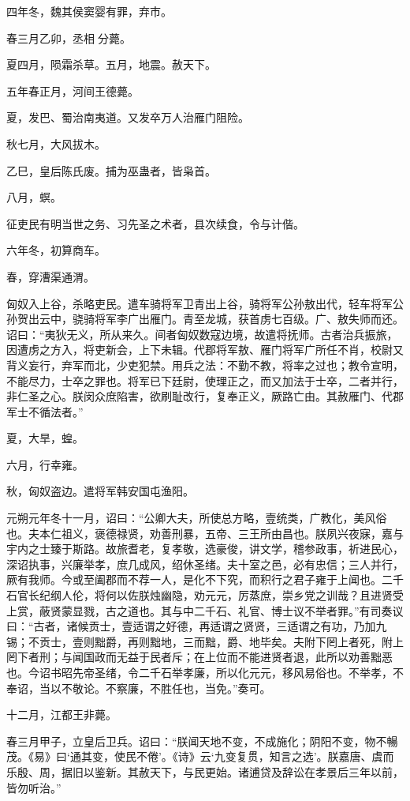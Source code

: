 \documentclass[]{article}
\begin{document}
四年冬，魏其侯窦婴有罪，弃市。

春三月乙卯，丞相分薨。

夏四月，陨霜杀草。五月，地震。赦天下。

五年春正月，河间王德薨。

夏，发巴、蜀治南夷道。又发卒万人治雁门阻险。

秋七月，大风拔木。

乙巳，皇后陈氏废。捕为巫蛊者，皆枭首。

八月，螟。

征吏民有明当世之务、习先圣之术者，县次续食，令与计偕。

六年冬，初算商车。

春，穿漕渠通渭。

匈奴入上谷，杀略吏民。遣车骑将军卫青出上谷，骑将军公孙敖出代，轻车将军公孙贺出云中，骁骑将军李广出雁门。青至龙城，获首虏七百级。广、敖失师而还。诏曰：``夷狄无义，所从来久。间者匈奴数寇边境，故遣将抚师。古者治兵振旅，因遭虏之方入，将吏新会，上下未辑。代郡将军敖、雁门将军广所任不肖，校尉又背义妄行，弃军而北，少吏犯禁。用兵之法：不勤不教，将率之过也；教令宣明，不能尽力，士卒之罪也。将军已下廷尉，使理正之，而又加法于士卒，二者并行，非仁圣之心。朕闵众庶陷害，欲刷耻改行，复奉正义，厥路亡由。其赦雁门、代郡军士不循法者。''

夏，大旱，蝗。

六月，行幸雍。

秋，匈奴盗边。遣将军韩安国屯渔阳。

元朔元年冬十一月，诏曰：``公卿大夫，所使总方略，壹统类，广教化，美风俗也。夫本仁祖义，褒德禄贤，劝善刑暴，五帝、三王所由昌也。朕夙兴夜寐，嘉与宇内之士臻于斯路。故旅耆老，复孝敬，选豪俊，讲文学，稽参政事，祈进民心，深诏执事，兴廉举孝，庶几成风，绍休圣绪。夫十室之邑，必有忠信；三人并行，厥有我师。今或至阖郡而不荐一人，是化不下究，而积行之君子雍于上闻也。二千石官长纪纲人伦，将何以佐朕烛幽隐，劝元元，厉蒸庶，崇乡党之训哉？且进贤受上赏，蔽贤蒙显戮，古之道也。其与中二千石、礼官、博士议不举者罪。''有司奏议曰：``古者，诸候贡士，壹适谓之好德，再适谓之贤贤，三适谓之有功，乃加九锡；不贡士，壹则黜爵，再则黜地，三而黜，爵、地毕矣。夫附下罔上者死，附上罔下者刑；与闻国政而无益于民者斥；在上位而不能进贤者退，此所以劝善黜恶也。今诏书昭先帝圣绪，令二千石举孝廉，所以化元元，移风易俗也。不举孝，不奉诏，当以不敬论。不察廉，不胜任也，当免。''奏可。

十二月，江都王非薨。

春三月甲子，立皇后卫兵。诏曰：``朕闻天地不变，不成施化；阴阳不变，物不暢茂。《易》曰`通其变，使民不倦'。《诗》云`九变复贯，知言之选'。朕嘉唐、虞而乐殷、周，据旧以鉴新。其赦天下，与民更始。诸逋贷及辞讼在孝景后三年以前，皆勿听治。''
\end{document}

